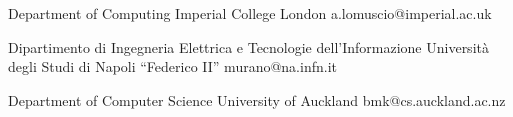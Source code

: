 \documentclass[10pt,a4paper,sans]{moderncv}
\begin{document}
{Department of Computing}
{Imperial College London}
{}
{a.lomuscio@imperial.ac.uk}


% 


{Dipartimento di Ingegneria Elettrica e Tecnologie dell'Informazione} 
{Universit\`a degli Studi di Napoli ``Federico II''}
{}
{murano@na.infn.it}

{Department of Computer Science}
{University of Auckland}
{}
{bmk@cs.auckland.ac.nz}



\fi
\end{document}
